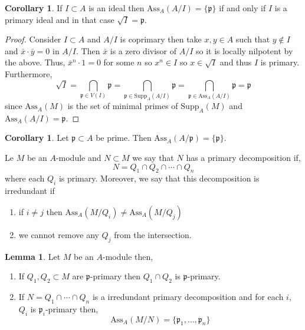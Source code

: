\documentclass[12pt]{article}
\newcommand{\Ass}[2]{\mathrm{Ass}_{#1}\left( #2 \right)}
\newcommand{\Supp}[2]{\mathrm{Supp}_{#1}\left(#2 \right)}
\newcommand{\p}{\mathfrak{p}}
\theoremstyle{remark}
\theoremstyle{definition}
\newtheorem{lemma}[theorem]{Lemma}
\newtheorem{corollary}[theorem]{Corollary}
\newenvironment{definition}[1][Definition:]{\begin{trivlist}
\item[\hskip \labelsep {\bfseries #1}]}{\end{trivlist}}
\begin{document}
\begin{corollary}
If $I \subset A$ is an ideal then $\Ass{A}{A / I} = \{ \p \}$ if and only if $I$ is a primary ideal and in that case $\sqrt{I} = \p$. 
\end{corollary}

\begin{proof}
Consider $I \subset A$ and $A / I$ is coprimary then take $x,y \in A$ such that $y \notin I$ and $\bar{x} \cdot \bar{y} = 0$ in $A / I$. Then $\bar{x}$ is a zero divisor of $A / I$ so it is locally nilpotent by the above. Thus, $\bar{x}^n \cdot 1 = 0$ for some $n$ so $x^n \in I$ so $x \in \sqrt{I}$ and thus $I$ is primary. Furthermore,
\[ \sqrt{I} = \bigcap_{\p \in V(I)} \p = \bigcap_{\p \in \Supp{A}{A / I}} \p = \bigcap_{\p \in \Ass{A}{A / I}} \p = \p \]
since $\Ass{A}{M}$ is the set of minimal primes of $\Supp{A}{M}$ and $\Ass{A}{A / I} = \p$.  
\end{proof}

\begin{corollary}
Let $\p \subset A$ be prime. Then $\Ass{A}{A/\p} = \{ \p \}$.
\end{corollary}

\begin{definition}
Le $M$ be an $A$-module and $N \subset M$ we say that $N$ has a primary decomposition if,
\[ N = Q_1 \cap Q_2 \cap \cdots \cap Q_n \]
where each $Q_i$ is primary. Moreover, we say that this decomposition is irredundant if 
\begin{enumerate}
\item if $i \neq j$ then $\Ass{A}{M / Q_i} \neq \Ass{A}{M / Q_j}$ 

\item we cannot remove any $Q_j$ from the intersection.
\end{enumerate}
\end{definition}

\begin{lemma}
Let $M$ be an $A$-module then,
\begin{enumerate}
\item If $Q_1, Q_2 \subset M$ are $\p$-primary then $Q_1 \cap Q_2$ is $\p$-primary.  

\item If $N = Q_1 \cap \cdots \cap Q_n$ is a irredundant primary decomposition and for each $i$, $Q_i$ is $\p_i$-primary then,
\[ \Ass{A}{M / N} = \{ \p_1, \dots, \p_n \} \] 
\end{enumerate}
\end{lemma}
\end{document}
